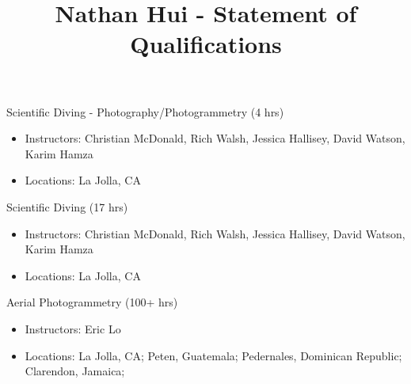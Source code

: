 \documentclass{article}
\title{Nathan Hui - Statement of Qualifications}
\begin{document}
\maketitle
Scientific Diving - Photography/Photogrammetry (4 hrs)
\begin{itemize}
    \item Instructors: Christian McDonald, Rich Walsh, Jessica Hallisey, David Watson, Karim Hamza
    \item Locations: La Jolla, CA
\end{itemize}

Scientific Diving (17 hrs)
\begin{itemize}
    \item Instructors: Christian McDonald, Rich Walsh, Jessica Hallisey, David Watson, Karim Hamza
    \item Locations: La Jolla, CA
\end{itemize}

Aerial Photogrammetry (100+ hrs)
\begin{itemize}
    \item Instructors: Eric Lo
    \item Locations: La Jolla, CA; Peten, Guatemala; Pedernales, Dominican Republic; Clarendon, Jamaica;
\end{itemize}
\end{document}
